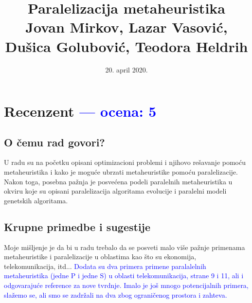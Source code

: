 \documentclass[a4paper]{report}
\newcommand{\odgovor}[1]{\textcolor{blue}{#1}}
\begin{document}
\title{Paralelizacija metaheuristika\\ \small{Jovan Mirkov, Lazar Vasović, Dušica Golubović, Teodora Heldrih}}

\date{20. april 2020.}

\maketitle

\tableofcontents

\chapter{Recenzent \odgovor{--- ocena: 5} }


\section{O čemu rad govori?}
U radu su na početku opisani optimizacioni problemi i njihovo rešavanje pomoću metaheuristika i kako je moguće ubrzati metaheuristike pomoću paralelizacije. Nakon toga, posebna pažnja je posvećena podeli paralelnih metaheuristika u okviru koje su opisani paralelizacija algoritama evolucije i paralelni modeli genetskih algoritama.
\section{Krupne primedbe i sugestije}
Moje mišljenje je da bi u radu trebalo da se posveti malo više pažnje primenama metaheuristike i paralelizacije u oblastima kao što su ekonomija, telekomunikacija, itd...
\odgovor{Dodata su dva primera primene paralalelnih metaheuristika (jedne P i jedne S) u oblasti telekomunikacija, strane 9 i 11, ali i odgovarajuće reference za nove tvrdnje. Imalo je još mnogo potencijalnih primera, slažemo se, ali smo se zadržali na dva zbog ograničenog prostora i zahteva.}
\end{document}
